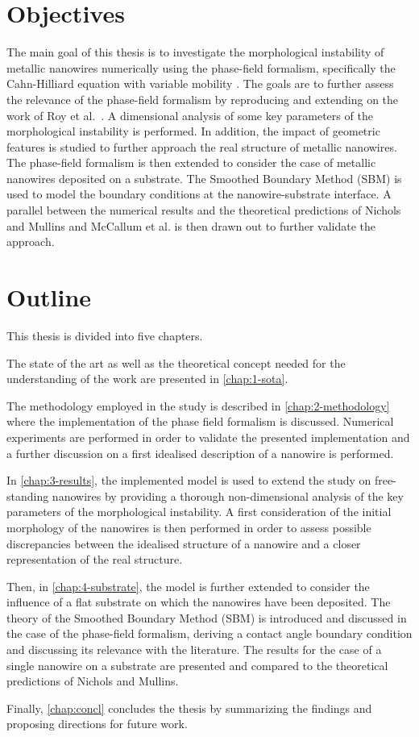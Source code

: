 \section*{Objectives}
The main goal of this thesis is to investigate the morphological instability of metallic nanowires numerically using the phase-field formalism, specifically the Cahn-Hilliard equation with variable mobility \cite{CahnHilliard1958, Cahn1959,Cahn1961,LeeHuhJeongShinYunKim2014,ZhuChenShenTikare1999,Langer1975}. The goals are to further assess the relevance of the phase-field formalism by reproducing and extending on the work of Roy et al.~\cite{RoyVarmaGururajan2021}. A dimensional analysis of some key parameters of the morphological instability is performed. In addition, the impact of geometric features is studied to further approach the real structure of metallic nanowires. The phase-field formalism is then extended to consider the case of metallic nanowires deposited on a substrate. The Smoothed Boundary Method (SBM) \cite{YuChenThornton2012} is used to model the boundary conditions at the nanowire-substrate interface. A parallel between the numerical results and the theoretical predictions of Nichols and Mullins \cite{NicholsMullins1965,Nichols1976} and McCallum et al. \cite{McCallumVoorheesMiksisDavisWong1996} is then drawn out to further validate the approach.
\newpage
\section*{Outline}
This thesis is divided into five chapters.

The state of the art as well as the theoretical concept needed for the understanding of the work are presented in \autoref{chap:1-sota}. 

The methodology employed in the study is described in \autoref{chap:2-methodology} where the implementation of the phase field formalism is discussed. Numerical experiments are performed in order to validate the presented implementation and a further discussion on a first idealised description of a nanowire is performed. 

In \autoref{chap:3-results}, the implemented model is used to extend the study on free-standing nanowires by providing a thorough non-dimensional analysis of the key parameters of the morphological instability. A first consideration of the initial morphology of the nanowires is then performed in order to assess possible discrepancies between the idealised structure of a nanowire and a closer representation of the real structure.

Then, in \autoref{chap:4-substrate}, the model is further extended to consider the influence of a flat substrate on which the nanowires have been deposited. The theory of the Smoothed Boundary Method (SBM) is introduced and discussed in the case of the phase-field formalism, deriving a contact angle boundary condition and discussing its relevance with the literature. The results for the case of a single nanowire on a substrate are presented and compared to the theoretical predictions of Nichols and Mullins. 

Finally, \autoref{chap:concl} concludes the thesis by summarizing the findings and proposing directions for future work.